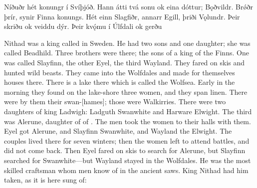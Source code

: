 \bpg\bpa{}Níðuðr hét konungr í Svíþjóð.
Hann átti tvá sonu ok eina dóttur;  Bǫðvildr.
Brǿðr  þrír, synir Finna konungs. Hét einn Slagfiðr, annarr Egill, þriði Vǫlundr.
Þeir skriðu ok veiddu dýr. Þeir kvǫ́mu í Úlfdali ok gerðu \epa

\bpb Nithad was a king called in Sweden.
He had two sons and one daughter; she was called Beadhild.
Three brothers were there; the sons of a king of the Finns. One was called Slayfinn, the other Eyel, the third Wayland.
They fared on skis and hunted wild beasts. They came into the Wolfdales and made for themselves houses there.
There is a lake there which is called the Wolfsea.
Early in the morning they found on the lake-shore three women, and they span linen. There were by them their swan-[hames]; those were Walkirries.
There were two daughters of king Ladwigh: Ladguth Swanwhite and Harware Elwight. The third was Alerune, daughter of  of .
The men took the women to their halls with them.  Eyel got Alerune, and Slayfinn Swanwhite, and Wayland the Elwight.
The couples lived there for seven winters; then the women left to attend battles, and did not come back.
Then Eyel fared on skis to search for Alerune, but Slayfinn searched for Swanwhite—but Wayland stayed in the Wolfdales.
He was the most skilled craftsman whom men know of in the ancient saws. King Nithad had him taken, as it is here sung of:\epb\epg

